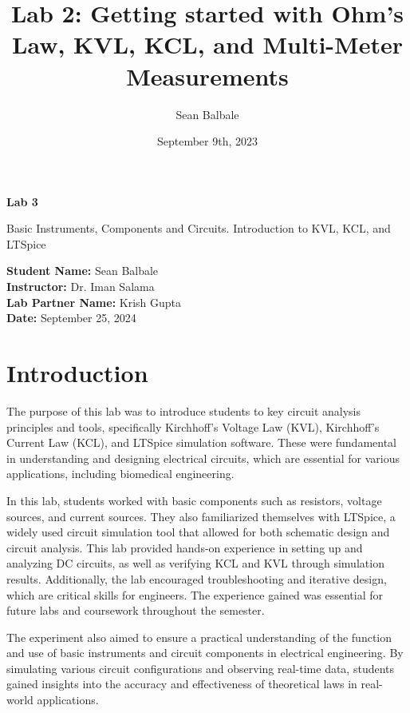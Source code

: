 \documentclass{article}
\title{Lab 2: Getting started with Ohm's Law, KVL, KCL, and Multi-Meter
Measurements}
\author{Sean Balbale}
\date{September 9th, 2023}
\begin{document}
\begin{titlepage}
	\begin{center}
		\vspace*{1in}

		\Huge
		\textbf{Lab 3}

		\LARGE
		Basic Instruments, Components and Circuits. Introduction to KVL, KCL, and LTSpice

		\vspace{3 in}

		\textbf{Student Name:} Sean Balbale
		\\ \textbf{Instructor:} Dr. Iman Salama
		\\ \textbf{Lab Partner Name:} Krish Gupta
		\\ \textbf{Date:} September 25, 2024

		\vfill


	\end{center}
\end{titlepage}

\newpage


\section{Introduction}
The purpose of this lab was to introduce students to key circuit analysis principles 
and tools, specifically Kirchhoff's Voltage Law (KVL), Kirchhoff's Current Law (KCL), 
and LTSpice simulation software. These were fundamental in understanding and designing 
electrical circuits, which are essential for various applications, including biomedical 
engineering. 
\newline

In this lab, students worked with basic components such as resistors, voltage sources, 
and current sources. They also familiarized themselves with LTSpice, a widely used 
circuit simulation tool that allowed for both schematic design and circuit analysis. 
This lab provided hands-on experience in setting up and analyzing DC circuits, as 
well as verifying KCL and KVL through simulation results. Additionally, the lab 
encouraged troubleshooting and iterative design, which are critical skills for engineers. 
The experience gained was essential for future labs and coursework throughout the semester.
\newline

The experiment also aimed to ensure a practical understanding of the function and use 
of basic instruments and circuit components in electrical engineering. By simulating 
various circuit configurations and observing real-time data, students gained insights
 into the accuracy and effectiveness of theoretical laws in real-world applications.
\end{document}
